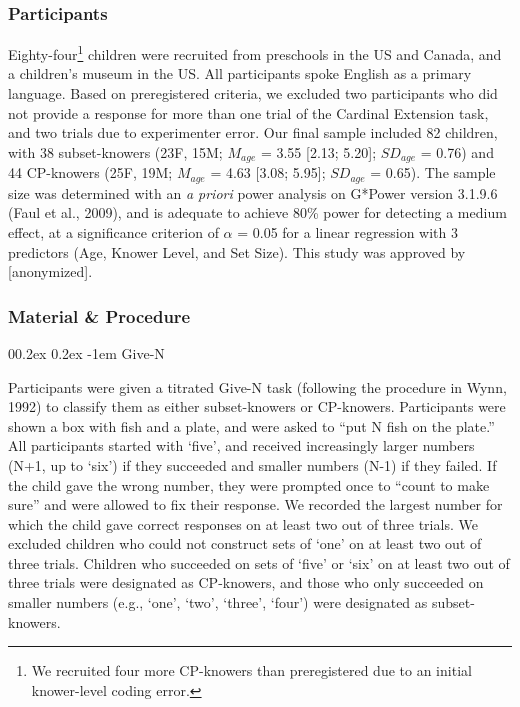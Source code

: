 \documentclass[
  man,floatsintext]{apa7}
\makeatletter
\let\oldparagraph\paragraph
\renewcommand{\paragraph}{
    \@ifstar
      \xxxParagraphStar
      \xxxParagraphNoStar
  }
\newcommand{\xxxParagraphStar}[1]{\oldparagraph*{#1}\mbox{}}
\newcommand{\xxxParagraphNoStar}[1]{\oldparagraph{#1}\mbox{}}
\renewcommand{\paragraph}{\@startsection{paragraph}{4}{\parindent}%
  {0\baselineskip \@plus 0.2ex \@minus 0.2ex}%
  {-1em}%
  {\normalfont\normalsize\bfseries\itshape\typesectitle}}
\renewcommand{\paragraph}{\@startsection{paragraph}{4}{\parindent}%
  {0\baselineskip \@plus 0.2ex \@minus 0.2ex}%
  {-1em}%
  {\normalfont\normalsize\bfseries\typesectitle}}
\makeatother
\begin{document}
\subsubsection{Participants}\label{participants}

Eighty-four\footnote{We recruited four more CP-knowers than preregistered due to an initial knower-level coding error.} children were recruited from preschools in the US and Canada, and a children's museum in the US.
All participants spoke English as a primary language. Based on preregistered criteria, we excluded two participants who did not provide a response for more than one trial of the Cardinal Extension task, and two trials due to experimenter error. Our final sample included 82 children, with 38 subset-knowers (23F, 15M; \(M_{age}\) = 3.55 {[}2.13; 5.20{]}; \(SD_{age}\) = 0.76)
and 44 CP-knowers (25F, 19M; \(M_{age}\) = 4.63 {[}3.08; 5.95{]}; \(SD_{age}\) = 0.65). The sample size was determined with an \emph{a priori} power analysis on G*Power version 3.1.9.6 (Faul et al., 2009), and is adequate to achieve 80\% power for detecting a medium effect, at a significance criterion of \(\alpha\) = 0.05 for a linear regression with 3 predictors (Age, Knower Level, and Set Size). This study was approved by {[}anonymized{]}.

\subsubsection{Material \& Procedure}\label{material-procedure}

\paragraph{Give-N}\label{give-n}

Participants were given a titrated Give-N task (following the procedure in Wynn, 1992) to classify them as either subset-knowers or CP-knowers. Participants were shown a box with fish and a plate, and were asked to ``put N fish on the plate.'' All participants started with `five', and received increasingly larger numbers (N+1, up to `six') if they succeeded and smaller numbers (N-1) if they failed. If the child gave the wrong number, they were prompted once to ``count to make sure'' and were allowed to fix their response. We recorded the largest number for which the child gave correct responses on at least two out of three trials. We excluded children who could not construct sets of `one' on at least two out of three trials. Children who succeeded on sets of `five' or `six' on at least two out of three trials were designated as CP-knowers, and those who only succeeded on smaller numbers (e.g., `one', `two', `three', `four') were designated as subset-knowers.
\end{document}
